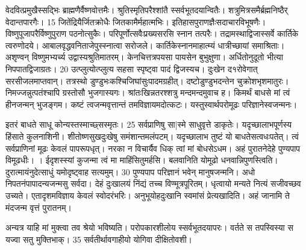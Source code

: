 वेदवित्प्रमुखैस्सद्भिः ब्राह्मणैर्वैष्णवोत्तमैः।
 श्रुतिस्मृतिपरैश्शांतै स्सर्वभूतदयान्वितैः।
 शत्रुमित्रसमैर्ब्रह्मनिष्ठैर् वेदान्तपारगैः।
 15 जितेंद्रियैर्जितक्रोधैः जितकामैर्महात्मभिः।
 इतिहासपुराणज्ञैःसदाचारविभूषणैः।
 विष्णुपूजापरैर्विष्णुपुराण पठनोत्सुकैः।
 परिपूर्णोत्सवैःप्रख्यसरसि स्नान तत्परैः।
 तद्रामस्थाद्विजास्सर्वे कार्तिके त्वरुणोदये।
 आबालवृद्धवनिताजेपुस्स्नात्वा सरोजले।
 कार्तिकेस्नानमाहात्म्यं धात्रीच्छायां समाश्रिताः।
 अशृण्वन् विष्णुमभ्यर्च्य उद्वास्यश्रुतिमातरम्।
 केनचित्तत्रपयसा पायसेन बुभुक्षुणा।
 अर्धितोनुदूतो भीत्या निपपातद्विजाग्रतः।
 20 उत्प्लुत्योत्प्लुत्य सहसा स्पृष्ट्वा पादं द्विजस्यच।
 दुःखेन द१रोवेगात् सरसीजलमाप्तवान्।
 तत्रस्थो डुण्डुभःकश्चिजिघांसुःपादमग्रहीत्।
 दष्टोडुण्डुभदन्तेन चुक्रोशभृशमातुरः।
 निमज्जन्नुत्पतंश्चापि ग्रस्तोसौ भुजगास्यगः।
 श्रांतःखिन्नतरश्शत्रु मन्दमन्दमुवाच ह।
 किमर्थं बाधसे मां त्वं हीनजन्मन् भुजङ्गम।
 कष्टं त्वजन्मवृत्तान्तं तमविज्ञायमदोत्कटः।
 यस्तुस्वार्थपरोमूढः परिज्ञानेस्वजन्मनः।
 
इतरं बाधते साधू कोन्यस्तस्माच्छ्सस्मृतः।
 25 सर्वप्राणिषु सा|स्मे साधुवृत्ते डाकृतेः।
 यदृच्छालाभपूर्णस्य हिंसाते कुलनाशिनी।
 शीतोष्णसुखदुःखेषु समंशान्तमलंपटम्।
 यदृच्छालाभ तुष्टं यो बाधतेसत्वधःपतेत्।
 त्वं सर्वप्राणिनां मूढः केवलं पापरूपधृत्।
 नरका न विचार्यैव धिक् त्वां मां बोधसेऽधम।
 अहं पुरातनेदेहे पुण्यपाप विमूढधीः।
 ।
 ईदृशस्स्यां कुजन्मा त्वं मा माहिंसितुमर्हसि।
 बलवानिति योमूढो धनवान्निपुणस्त्विति।
 दुरात्मायंनुदेत्साधुं यमोदृष्ट्वाह सत्यमुम्।
 30 पुण्यपाप परिज्ञानं भवेन् मानुषजन्मनि।
 अधो निपतनंपापादन्यजन्मसु सर्वदा।
 देहं दुःखालयं निंद्यं तच्च विण्मूत्रपूरितम्।
 धृत्वायो मन्यते नित्यं सजीवच्छव उच्यते।
 एतादृशमविज्ञाय केवलं स्वोदरंभरिः।
 अनुभूयोहदुःखानि स्वमांसं प्रेत्यखादिति।
 अहं जानामि ते मंदजन्म वृत्तं पुरातनम्।
 
अन्यत्र याहि मां मुक्त्वा तव श्रेयो भविष्यति।
 परोपकारशीलोय स्सर्वभूतदयापरः।
 वर्तते स तपस्विस्या स यज्वा सतु मुक्तिभाक्।
 35 सर्वतीर्थावगाहीयो योगिवा दीक्षितोवशी।
 
